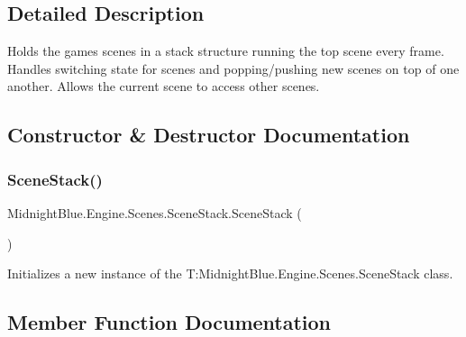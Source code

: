 \subsection{Detailed Description}
Holds the games scenes in a stack structure running the top scene every frame. Handles switching state for scenes and popping/pushing new scenes on top of one another. Allows the current scene to access other scenes. 



\subsection{Constructor \& Destructor Documentation}
\hypertarget{class_midnight_blue_1_1_engine_1_1_scenes_1_1_scene_stack_a542204ca696d4acd37a0912043e38fa0}{}\label{class_midnight_blue_1_1_engine_1_1_scenes_1_1_scene_stack_a542204ca696d4acd37a0912043e38fa0} 
\subsubsection{\texorpdfstring{Scene\+Stack()}{SceneStack()}}
{\footnotesize\ttfamily Midnight\+Blue.\+Engine.\+Scenes.\+Scene\+Stack.\+Scene\+Stack (\begin{DoxyParamCaption}{ }\end{DoxyParamCaption})\hspace{0.3cm}{\ttfamily [inline]}}



Initializes a new instance of the T\+:\+Midnight\+Blue.\+Engine.\+Scenes.\+Scene\+Stack class. 



\subsection{Member Function Documentation}
\hypertarget{class_midnight_blue_1_1_engine_1_1_scenes_1_1_scene_stack_a8c0ab363d287940ce8a66d1ab1356714}{}\label{class_midnight_blue_1_1_engine_1_1_scenes_1_1_scene_stack_a8c0ab363d287940ce8a66d1ab1356714} 
